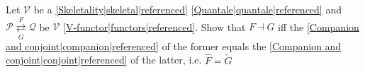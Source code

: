 
Let $\mathcal{V}$ be a \ref{Skeletality|skeletal|referenced} \ref{Quantale|quantale|referenced} and $\mathcal{P}\overset{F}{\underset{G}\rightleftarrows} \mathcal{Q}$ be $\mathcal{V}$ \ref{V-functor|functors|referenced}.
    Show that $F \dashv G$ iff the \ref{Companion and conjoint|companion|referenced} of the former equals the \ref{Companion and conjoint|conjoint|referenced} of the latter, i.e. $\hat F = \check G$